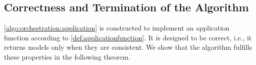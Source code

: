 




\subsection{Correctness and Termination of the Algorithm}
\label{chap:orchestration:decidability:correctness_termination}

\autoref{algo:orchestration:application} is constructed to implement an application function according to \autoref{def:applicationfunction}.
It is designed to be correct, i.e., it returns models only when they are consistent.
We show that the algorithm fulfills these properties in the following theorem.

